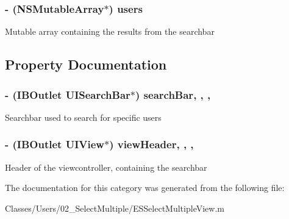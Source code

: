 \subsubsection[{users}]{\setlength{\rightskip}{0pt plus 5cm}-\/ (N\+S\+Mutable\+Array$\ast$) users\hspace{0.3cm}{\ttfamily [protected]}}\label{category_e_s_select_multiple_view_07_08_a264ae40deeb45efc1742b19947c70b9c}
Mutable array containing the results from the searchbar 

\subsection{Property Documentation}
\hypertarget{category_e_s_select_multiple_view_07_08_a58e40c69a0d5b3ce93a13fea5c9c9caa}{}
\subsubsection[{search\+Bar}]{\setlength{\rightskip}{0pt plus 5cm}-\/ (I\+B\+Outlet U\+I\+Search\+Bar$\ast$) search\+Bar\hspace{0.3cm}{\ttfamily [read]}, {\ttfamily [write]}, {\ttfamily [nonatomic]}, {\ttfamily [strong]}}\label{category_e_s_select_multiple_view_07_08_a58e40c69a0d5b3ce93a13fea5c9c9caa}
Searchbar used to search for specific users \hypertarget{category_e_s_select_multiple_view_07_08_aac8d8f4b6bb2db74670ed6f1022c4408}{}
\subsubsection[{view\+Header}]{\setlength{\rightskip}{0pt plus 5cm}-\/ (I\+B\+Outlet U\+I\+View$\ast$) view\+Header\hspace{0.3cm}{\ttfamily [read]}, {\ttfamily [write]}, {\ttfamily [nonatomic]}, {\ttfamily [strong]}}\label{category_e_s_select_multiple_view_07_08_aac8d8f4b6bb2db74670ed6f1022c4408}
Header of the viewcontroller, containing the searchbar 

The documentation for this category was generated from the following file\+:\begin{DoxyCompactItemize}
\item 
Classes/\+Users/02\+\_\+\+Select\+Multiple/E\+S\+Select\+Multiple\+View.\+m\end{DoxyCompactItemize}
